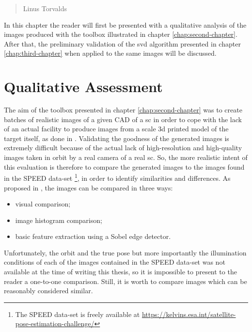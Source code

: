 \begin{quotation}
  {\footnotesize
    \begin{flushright}
      Linus Torvalds
    \end{flushright}
  }
\end{quotation}
\vspace{0.5cm}

In this chapter the reader will first be presented with a qualitative analysis of the images produced with the toolbox illustrated in chapter \ref{chap:second-chapter}. After that, the preliminary validation of the \acrshort{svd} algorithm presented in chapter \ref{chap:third-chapter}  when applied to the same images will be discussed.

\section{Qualitative Assessment}
The aim of the toolbox presented in chapter \ref{chap:second-chapter} was to create batches of realistic images of a given CAD of a \acrshort{sc} in order to cope with the lack of an actual facility to produce images from a scale \acrshort{3d} printed model of the target itself, as done in \cite{Beierle2019}. Validating the goodness of the generated images is extremely difficult because of the actual lack of high-resolution and high-quality images taken in orbit by a real camera of a real \acrshort{sc}. So, the more realistic intent of this evaluation is therefore to compare the generated images to the images found in the SPEED data-set \footnote{The SPEED data-set is freely available at \url{https://kelvins.esa.int/satellite-pose-estimation-challenge/}}, in order to identify similarities and differences. As proposed in \cite{pangufinal}, the images can be compared in three ways:

\begin{itemize}
  \item visual comparison;
  \item image histogram comparison;
  \item basic feature extraction using a Sobel edge detector.
\end{itemize}

Unfortunately, the orbit and the true pose but more importantly the illumination conditions of each of the images contained in the SPEED data-set was not available at the time of writing this thesis, so it is impossible to present to the reader a one-to-one comparison. Still, it is worth to compare images which can be reasonably considered similar.

